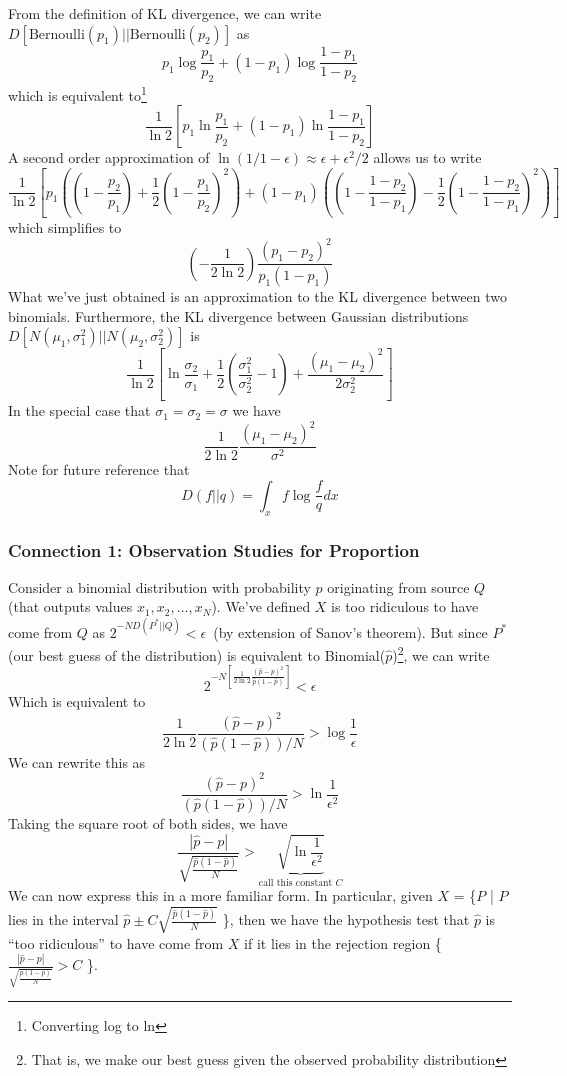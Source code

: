 \documentclass[11pt]{article}
\theoremstyle{definition}
\begin{document}
From the definition of KL divergence, we can write $D[\text{Bernoulli}(p_1) || \text{Bernoulli}(p_2)]$ as $$p_1 \log \frac{p_1}{p_2} + (1-p_1) \log \frac{1-p_1}{1-p_2}$$which is equivalent to\footnote{Converting log to ln} $$\frac{1}{\ln 2} \left[ p_1 \ln \frac{p_1}{p_2} + (1-p_1) \ln \frac{1-p_1}{1-p_2} \right] $$ A second order approximation of $\ln (1 / 1-\epsilon) \approx \epsilon + \epsilon^2 / 2$ allows us to write $$\frac{1}{\ln 2} \left[ p_1 \left( \left( 1 - \frac{p_2}{p_1} \right) + \frac{1}{2} \left( 1 - \frac{p_1}{p_2} \right)^2 \right) + (1-p_1) \left( \left( 1 - \frac{1-p_2}{1-p_1} \right) - \frac{1}{2} \left( 1 - \frac{1 - p_2}{1 - p_1} \right)^2 \right) \right]$$which simplifies to $$ \left( -\frac{1}{2 \ln 2} \right) \frac{(p_1 - p_2)^2}{p_1(1-p_1)}$$What we've just obtained is an approximation to the KL divergence between two binomials. Furthermore, the KL divergence between Gaussian distributions $D[N(\mu_1, \sigma_1^2) || N(\mu_2, \sigma_2^2)]$ is $$\frac{1}{\ln 2} \left[ \ln \frac{\sigma_2}{\sigma_1} + \frac{1}{2} \left( \frac{\sigma_1^2}{\sigma_2^2} - 1 \right) + \frac{(\mu_1 - \mu_2)^2}{2 \sigma_2^2} \right]$$In the special case that $\sigma_1 = \sigma_2 = \sigma$ we have $$\frac{1}{2\ln 2} \frac{(\mu_1 - \mu_2)^2}{\sigma^2}$$Note for future reference that $$D(f || q) = \int_x f \log \frac{f}{q} dx$$

\subsubsection{Connection 1: Observation Studies for Proportion}

Consider a binomial distribution with probability $p$ originating from source $Q$ (that outputs values $x_1, x_2, \dots, x_N$). We've defined $X$ is too ridiculous to have come from $Q$ as $2^{-ND(P^*||Q)} < \epsilon$\ (by extension of Sanov's theorem). But since $P^*$ (our best guess of the distribution) is equivalent to Binomial($\hat{p}$)\footnote{That is, we make our best guess given the observed probability distribution}, we can write $$2^{-N \left[ \frac{1}{2 \ln 2} \frac{(\hat{p} - p)^2}{\hat{p}(1 - \hat{p})} \right]} < \epsilon$$Which is equivalent to $$ \frac{1}{2 \ln 2} \frac{(\hat{p} - p)^2}{(\hat{p}(1 - \hat{p}))/N} > \log \frac{1}{\epsilon}$$ We can rewrite this as $$\frac{(\hat{p} - p)^2}{(\hat{p}(1 - \hat{p}))/N} > \ln \frac{1}{\epsilon^2}$$ Taking the square root of both sides, we have $$\frac{|\hat{p} - p|}{ \sqrt{\frac{\hat{p}(1 - \hat{p})}{N}}} > \underbrace{\sqrt{\ln \frac{1}{\epsilon^2}}}_{\text{call this constant } C}$$ We can now express this in a more familiar form. In particular, given $X$ = \{$P$ | $P$ lies in the interval $\hat{p} \pm C \sqrt{\frac{\hat{p}(1 - \hat{p})}{N}}$ \}, then we have the hypothesis test that $\hat{p}$ is ``too ridiculous'' to have come from $X$ if it lies in the rejection region \{ $\frac{|\hat{p} - p|}{ \sqrt{\frac{\hat{p}(1 - \hat{p})}{N}}} > C$ \}. 
\end{document}
